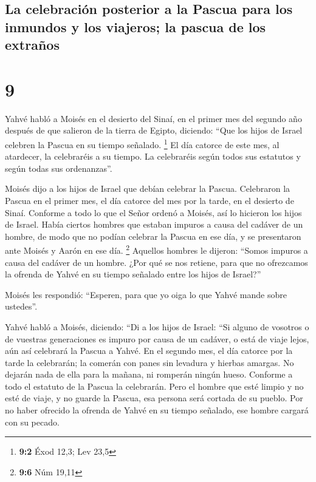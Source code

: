 \hypertarget{la-celebraciuxf3n-posterior-a-la-pascua-para-los-inmundos-y-los-viajeros-la-pascua-de-los-extrauxf1os}{%
\subsection{La celebración posterior a la Pascua para los inmundos y los
viajeros; la pascua de los
extraños}\label{la-celebraciuxf3n-posterior-a-la-pascua-para-los-inmundos-y-los-viajeros-la-pascua-de-los-extrauxf1os}}

\hypertarget{section-8}{%
\section{9}\label{section-8}}

 Yahvé habló a Moisés en el desierto del Sinaí, en el
primer mes del segundo año después de que salieron de la tierra de
Egipto, diciendo:  ``Que los hijos de Israel celebren la
Pascua en su tiempo señalado. \footnote{\textbf{9:2} Éxod 12,3; Lev 23,5}
 El día catorce de este mes, al atardecer, la celebraréis
a su tiempo. La celebraréis según todos sus estatutos y según todas sus
ordenanzas''.

 Moisés dijo a los hijos de Israel que debían celebrar la
Pascua.  Celebraron la Pascua en el primer mes, el día
catorce del mes por la tarde, en el desierto de Sinaí. Conforme a todo
lo que el Señor ordenó a Moisés, así lo hicieron los hijos de Israel.
 Había ciertos hombres que estaban impuros a causa del
cadáver de un hombre, de modo que no podían celebrar la Pascua en ese
día, y se presentaron ante Moisés y Aarón en ese día. \footnote{\textbf{9:6}
  Núm 19,11}  Aquellos hombres le dijeron: ``Somos impuros
a causa del cadáver de un hombre. ¿Por qué se nos retiene, para que no
ofrezcamos la ofrenda de Yahvé en su tiempo señalado entre los hijos de
Israel?''

 Moisés les respondió: ``Esperen, para que yo oiga lo que
Yahvé mande sobre ustedes''.

 Yahvé habló a Moisés, diciendo:  ``Di a
los hijos de Israel: ``Si alguno de vosotros o de vuestras generaciones
es impuro por causa de un cadáver, o está de viaje lejos, aún así
celebrará la Pascua a Yahvé.  En el segundo mes, el día
catorce por la tarde la celebrarán; la comerán con panes sin levadura y
hierbas amargas.  No dejarán nada de ella para la mañana,
ni romperán ningún hueso. Conforme a todo el estatuto de la Pascua la
celebrarán.  Pero el hombre que esté limpio y no esté de
viaje, y no guarde la Pascua, esa persona será cortada de su pueblo. Por
no haber ofrecido la ofrenda de Yahvé en su tiempo señalado, ese hombre
cargará con su pecado.

